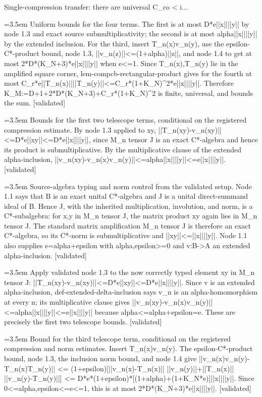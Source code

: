\documentclass{article}
\newcommand{\step}[1]{\par\noindent\hangindent=3.5em\hangafter=1%
  \makebox[3.5em][l]{\textbf{#1.}}}
\newcommand{\steptag}[1]{\hfill{\small\textsf{[#1]}}}
\begin{document}
\begin{proofbox}{Single-compression transfer: there are universal C\_co < i...}
\step{1.5.2} Uniform bounds for the four terms. The first is at most D*e||x||||y|| by node 1.3 and exact source submultiplicativity; the second is at most alpha||x||||y|| by the extended inclusion. For the third, insert T\_n(x)v\_n(y), use the epsilon-C*-product bound, node 1.3, ||v\_n(z)||<=(1+alpha)||z||, and node 1.4 to get at most 2*D*(K\_N+3)*e||x||||y|| when e<=1. Since T\_n(x),T\_n(y) lie in the amplified square corner, lem-compcb-rectangular-product gives for the fourth at most C\_r*e||T\_n(x)||||T\_n(y)||<=C\_r*(1+K\_N)\textasciicircum{}2*e||x||||y||. Therefore K\_M:=D+1+2*D*(K\_N+3)+C\_r*(1+K\_N)\textasciicircum{}2 is finite, universal, and bounds the sum. \steptag{validated} \\[6pt]
\step{1.5.2.1} Bounds for the first two telescope terms, conditional on the registered compression estimate. By node 1.3 applied to xy, ||T\_n(xy)-v\_n(xy)||<=D*e||xy||<=D*e||x||||y||, since M\_n tensor J is an exact C*-algebra and hence its product is submultiplicative. By the multiplicative clause of the extended alpha-inclusion, ||v\_n(xy)-v\_n(x)v\_n(y)||<=alpha||x||||y||<=e||x||||y||. \steptag{validated} \\[6pt]
\step{1.5.2.1.1} Source-algebra typing and norm control from the validated setup. Node 1.1 says that B is an exact unital C*-algebra and J is a unital direct-summand ideal of B. Hence J, with the inherited multiplication, involution, and norm, is a C*-subalgebra: for x,y in M\_n tensor J, the matrix product xy again lies in M\_n tensor J. The standard matrix amplification M\_n tensor J is therefore an exact C*-algebra, so its C*-norm is submultiplicative and ||xy||<=||x||||y||. Node 1.1 also supplies e=alpha+epsilon with alpha,epsilon>=0 and v:B->A an extended alpha-inclusion. \steptag{validated} \\[4pt]
\step{1.5.2.1.2} Apply validated node 1.3 to the now correctly typed element xy in M\_n tensor J: ||T\_n(xy)-v\_n(xy)||<=D*e||xy||<=D*e||x||||y||. Since v is an extended alpha-inclusion, def-extended-delta-inclusion says v\_n is an alpha-homomorphism at every n; its multiplicative clause gives ||v\_n(xy)-v\_n(x)v\_n(y)||<=alpha||x||||y||<=e||x||||y|| because alpha<=alpha+epsilon=e. These are precisely the first two telescope bounds. \steptag{validated} \\[4pt]
\step{1.5.2.2} Bound for the third telescope term, conditional on the registered compression and norm estimates. Insert T\_n(x)v\_n(y). The epsilon-C*-product bound, node 1.3, the inclusion norm bound, and node 1.4 give ||v\_n(x)v\_n(y)-T\_n(x)T\_n(y)|| <= (1+epsilon)[||v\_n(x)-T\_n(x)|| ||v\_n(y)||+||T\_n(x)|| ||v\_n(y)-T\_n(y)||] <= D*e*(1+epsilon)*[(1+alpha)+(1+K\_N*e)]||x||||y||. Since 0<=alpha,epsilon<=e<=1, this is at most 2*D*(K\_N+3)*e||x||||y||. \steptag{validated} \\[4pt]

\end{proofbox}
\end{document}
